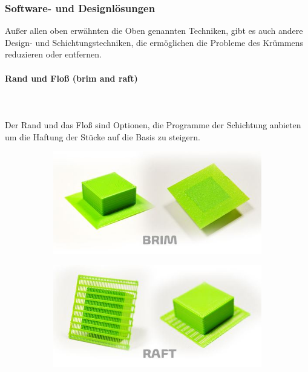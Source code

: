 \documentclass[11pt,a4paper]{article}
\begin{document}
		\subsubsection{Software- und Designlösungen}Außer allen oben erwähnten die Oben genannten Techniken, gibt es auch andere Design- und Schichtungstechniken, die ermöglichen die Probleme des Krümmens reduzieren oder entfernen.
			\paragraph{Rand und Floß (brim and raft)}\mbox{}\\\\
Der Rand und das Floß sind Optionen, die Programme der Schichtung anbieten um die Haftung der Stücke auf die Basis zu steigern.
\begin{figure}[H]
    \centering
    \begin{subfigure}[b]{0.4\textwidth}
        \includegraphics[width=\textwidth,cfbox=azul_marcos 4pt 0pt]{FOTOS/BRIM}
    \end{subfigure}
    \qquad %
    \begin{subfigure}[b]{0.4\textwidth}
        \includegraphics[width=\textwidth,cfbox=azul_marcos 4pt 0pt]{FOTOS/RAFT}
    \end{subfigure}   
\end{figure}
\end{document}
